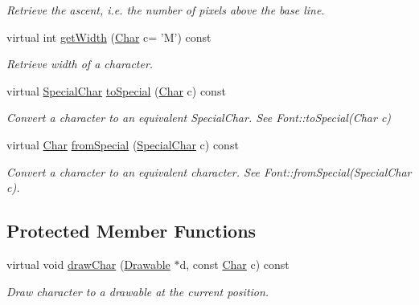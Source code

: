 \begin{DoxyCompactItemize}
\begin{DoxyCompactList}\small\item\em Retrieve the ascent, i.\-e. the number of pixels above the base line. \end{DoxyCompactList}\item 
\hypertarget{classGUI_1_1BitmapFont_a9929de2620d992dae0acd404a9ccdbea}{virtual int \hyperlink{classGUI_1_1BitmapFont_a9929de2620d992dae0acd404a9ccdbea}{get\-Width} (\hyperlink{namespaceGUI_af6b04b46d40197b4f00e553d7d1a3e4c}{Char} c= 'M') const }\label{classGUI_1_1BitmapFont_a9929de2620d992dae0acd404a9ccdbea}

\begin{DoxyCompactList}\small\item\em Retrieve width of a character. \end{DoxyCompactList}\item 
\hypertarget{classGUI_1_1BitmapFont_ac864500d84219f8818f0741d65194a61}{virtual \hyperlink{classGUI_1_1Font_af3c234cd3febe27dbe9c76e6cc5cad3a}{Special\-Char} \hyperlink{classGUI_1_1BitmapFont_ac864500d84219f8818f0741d65194a61}{to\-Special} (\hyperlink{namespaceGUI_af6b04b46d40197b4f00e553d7d1a3e4c}{Char} c) const }\label{classGUI_1_1BitmapFont_ac864500d84219f8818f0741d65194a61}

\begin{DoxyCompactList}\small\item\em Convert a character to an equivalent Special\-Char. See Font\-::to\-Special(\-Char c) \end{DoxyCompactList}\item 
\hypertarget{classGUI_1_1BitmapFont_a38227a28f83e1c3e0fc01f26161c74ed}{virtual \hyperlink{namespaceGUI_af6b04b46d40197b4f00e553d7d1a3e4c}{Char} \hyperlink{classGUI_1_1BitmapFont_a38227a28f83e1c3e0fc01f26161c74ed}{from\-Special} (\hyperlink{classGUI_1_1Font_af3c234cd3febe27dbe9c76e6cc5cad3a}{Special\-Char} c) const }\label{classGUI_1_1BitmapFont_a38227a28f83e1c3e0fc01f26161c74ed}

\begin{DoxyCompactList}\small\item\em Convert a character to an equivalent character. See Font\-::from\-Special(\-Special\-Char c). \end{DoxyCompactList}\end{DoxyCompactItemize}
\subsection*{Protected Member Functions}
\begin{DoxyCompactItemize}
\item 
virtual void \hyperlink{classGUI_1_1BitmapFont_a46ad991d5469877c111726f535095017}{draw\-Char} (\hyperlink{classGUI_1_1Drawable}{Drawable} $\ast$d, const \hyperlink{namespaceGUI_af6b04b46d40197b4f00e553d7d1a3e4c}{Char} c) const 
\begin{DoxyCompactList}\small\item\em Draw character to a drawable at the current position. \end{DoxyCompactList}\end{DoxyCompactItemize}
